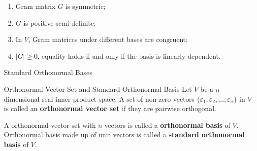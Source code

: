 \documentclass[11pt]{../../TexTemplate/elegantbook} %
\begin{document}
\begin{property}
    \begin{enumerate}
        \item Gram matrix \( G \) is symmetric; 
        \item \( G \) is positive semi-definite;
        \item In \(V\), Gram matrices under different bases are congruent;
        \item \(|G|\geqslant 0\), equality holds if and only if the basis is linearly dependent.
    \end{enumerate}
\end{property}

\begin{leftbarTitle}{Standard Orthonormal Bases}\end{leftbarTitle}
\begin{definition}{Orthonormal Vector Set and Standard Orthonormal Basis}
    Let \( V \) be a \(n\)-dimensional real inner product space.
    A set of non-zero vectors \( \{ \varepsilon_1, \varepsilon_2, \dots, \varepsilon_n \} \) in \( V \) 
    is called an \textbf{orthonormal vector set} if they are pairwise orthogonal.

    A orthonormal vector set with \( n \) vectors is called a \textbf{orthonormal basis} of \( V \).
    Orthonormal basis made up of unit vectors is called a \textbf{standard orthonormal basis} of \( V \).
\end{definition}
\end{document}
